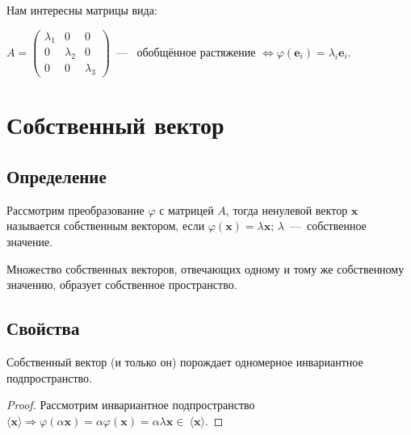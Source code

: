 Нам интересны матрицы вида:

$A=\left( \begin{array}{ccc} %
    \lambda_1 & 0 & 0  \\
    0 & \lambda_2& 0\\
    0&0&\lambda_3
\end{array}\right)$~---~ обобщённое растяжение $\Leftrightarrow \varphi(\textbf{e$_i$}) = \lambda_i\textbf{e$_i$}$.

\section{Собственный вектор}
\subsection{Определение}
Рассмотрим преобразование  $\varphi$ с матрицей $A$, тогда ненулевой вектор $\textbf{x}$ называется \textsf{собственным вектором}, если  $\varphi(\textbf{x}) = \lambda \textbf{x}$; $\lambda$~---~собственное значение. %

Множество собственных векторов, отвечающих одному и тому же собственному значению, образует \textsf{собственное пространство}.
\subsection{Свойства}
\begin{predlog} %
Собственный вектор (и только он) порождает одномерное инвариантное подпространство. %
\end{predlog}
\begin{proof}
Рассмотрим инвариантное подпространство  $\langle \textbf{x} \rangle \Rightarrow \varphi(\alpha \textbf{x}) = \alpha \varphi(\textbf{x}) = \alpha\lambda \textbf{x} \in~\langle \textbf{x}\rangle$.
\end{proof}
